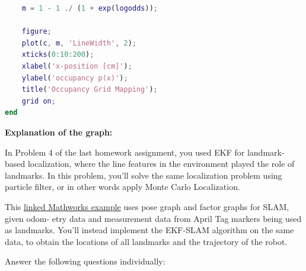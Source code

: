 \documentclass[answers]{exam}
\begin{document}
\begin{questions}
\begin{solution}
\begin{lstlisting}[language=Matlab, caption=Occupancy Grid Mapping, label={lst:code}]
    % Converting the logodds function to probability 
    m = 1 - 1 ./ (1 + exp(logodds));

    figure;
    plot(c, m, 'LineWidth', 2);
    xticks(0:10:200);
    xlabel('x-position [cm]');
    ylabel('occupancy p(x)');
    title('Occupancy Grid Mapping');
    grid on;
end     
        \end{lstlisting}

        \textbf{Explanation of the graph:}
        \newline
        \\

        
    \end{solution}

    \question[25]
    In Problem 4 of the last homework assignment, you used EKF for landmark-based localization, where the line features in the environment played the role of landmarks. In this problem, you'll solve the same localization problem using particle filter, or in other words apply Monte Carlo Localization.

    \begin{solution}
    \end{solution}

    \question[(Bonus) 20]
    This \href{https://www.mathworks.com/help/nav/ug/landmark-slam-using-apriltag-markers.html}{linked Mathworks example} uses pose graph and factor graphs for SLAM, given odom-
    etry data and measurement data from April Tag markers being used as landmarks. You'll
    instead implement the EKF-SLAM algorithm on the same data, to obtain the locations of all
    landmarks and the trajectory of the robot.

    \begin{solution}
    \end{solution}

    \question[20]
    Answer the following questions individually:
\end{questions}
\end{document}
